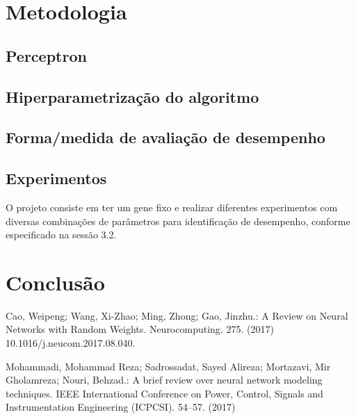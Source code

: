 \documentclass[runningheads]{llncs}
\begin{document}
\section{Metodologia}

\subsection{Perceptron}

\subsection{Hiperparametrização do algoritmo}


\subsection{Forma/medida de avaliação de desempenho}

\subsection{Experimentos}


O projeto consiste em ter um gene fixo e realizar diferentes experimentos com diversas combinações de parâmetros para identificação de desempenho, conforme especificado na sessão 3.2. 


\section{Conclusão}

%
%
%
% 
% 
%

Cao, Weipeng; Wang, Xi-Zhao; Ming, Zhong; Gao, Jinzhu.: A Review on Neural Networks with Random Weights. Neurocomputing. 275. (2017) 10.1016/j.neucom.2017.08.040. 

Mohammadi, Mohammad Reza; Sadrossadat, Sayed Alireza; Mortazavi, Mir Gholamreza; Nouri, Behzad.: A brief review over neural network modeling techniques. IEEE International Conference on Power, Control, Signals and Instrumentation Engineering (ICPCSI). 54--57. (2017)
\end{document}

